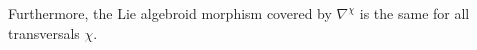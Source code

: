 \documentclass[preprint]{elsarticle}
\def\ba#1\ea{\begin{align}#1\end{align}}
\def\bas#1\eas{\begin{align*}#1\end{align*}}
\theoremstyle{plain}
\theoremstyle{remark}
\theoremstyle{definition}
\begin{document}
%
Furthermore, the Lie algebroid morphism covered by $\nabla^\chi$ is the same for all transversals $\chi$.
\end{document}
